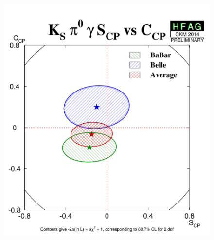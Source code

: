 \begin{figure}[htbp]
\begin{center}
{      \includegraphics{figures/cp_uta/KSpi0gammaS_CPvsC_CP}
    } \\
\end{center}
\end{figure}
